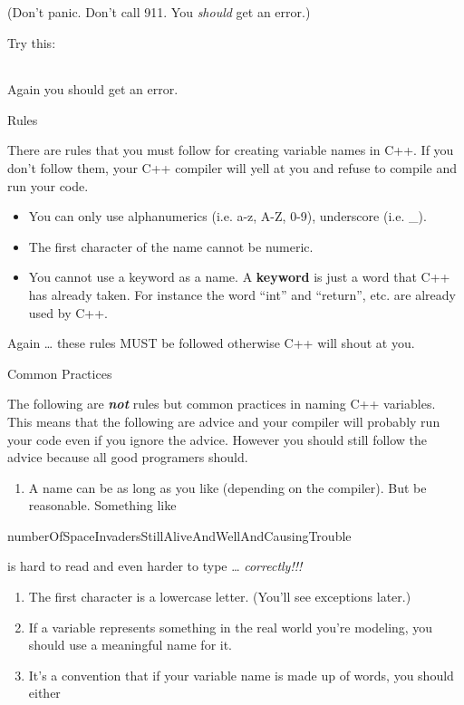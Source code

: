 \documentclass[
]{article}
\providecommand{\tightlist}{%
  \setlength{\itemsep}{0pt}\setlength{\parskip}{0pt}}
\begin{document}
\begin{longtable}[]{@{}@{}}
\toprule
\endhead
\bottomrule
\end{longtable}

(Don't panic. Don't call 911. You \emph{should} get an error.)

Try this:

\begin{longtable}[]{@{}@{}}
\toprule
\endhead
\bottomrule
\end{longtable}

Again you should get an error.

Rules

There are rules that you must follow for creating variable names in C++.
If you don't follow them, your C++ compiler will yell at you and refuse
to compile and run your code.

\begin{itemize}
\item
  You can only use alphanumerics (i.e. a-z, A-Z, 0-9), underscore (i.e.
  \_).
\item
  The first character of the name cannot be numeric.
\item
  You cannot use a keyword as a name. A \textbf{keyword} is just a word
  that C++ has already taken. For instance the word ``int'' and
  ``return'', etc. are already used by C++.
\end{itemize}

Again \ldots{} these rules MUST be followed otherwise C++ will shout at
you.

Common Practices

The following are \emph{\textbf{not}} rules but common practices in
naming C++ variables. This means that the following are advice and your
compiler will probably run your code even if you ignore the advice.
However you should still follow the advice because all good programers
should.

\begin{enumerate}
\def\labelenumi{\arabic{enumi}.}
\tightlist
\item
  A name can be as long as you like (depending on the compiler). But be
  reasonable. Something like
\end{enumerate}

numberOfSpaceInvadersStillAliveAndWellAndCausingTrouble

is hard to read and even harder to type \ldots{} \emph{correctly!!!}

\begin{enumerate}
\def\labelenumi{\arabic{enumi}.}
\setcounter{enumi}{1}
\item
  The first character is a lowercase letter. (You'll see exceptions
  later.)
\item
  If a variable represents something in the real world you're modeling,
  you should use a meaningful name for it.
\item
  It's a convention that if your variable name is made up of words, you
  should either
\end{enumerate}
\end{document}
